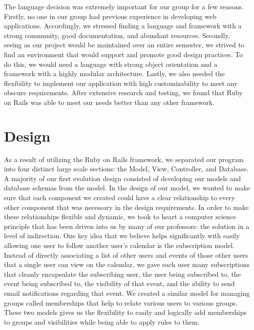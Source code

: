 \documentclass[11pt]{article}
\begin{document}

The language decision was extremely important for our group for a few reasons. Firstly, no one in our group had previous experience in developing web applications. Accordingly, we stressed finding a language and framework with a strong community, good documentation, and abundant resources. Secondly, seeing as our project would be maintained over an entire semester, we strived to find an environment that would support and promote good design practices. To do this, we would need a language with strong object orientation and a framework with a highly modular architecture. Lastly, we also needed the flexibility to implement our application with high customizability to meet any obscure requirements. After extensive research and testing, we found that Ruby on Rails was able to meet our needs better than any other framework. 


\section{Design}

As a result of utilizing the Ruby on Rails framework, we separated our program into four distinct large scale sections: the Model, View, Controller, and Database.  A majority of our first evolution design consisted of developing our models and database schemas from the model.  In the design of our model, we wanted to make sure that each component we created could have a clear relationship to every other component that was necessary in the design requirements.  In order to make these relationships flexible and dynamic, we took to heart a computer science principle that has been driven into us by many of our professors: the solution in a level of indirection.  One key idea that we believe helps significantly with easily allowing one user to follow another user's calendar is the subscription model.  Instead of directly associating a list of other users and events of those other users that a single user can view on the calendar, we gave each user many subscriptions that cleanly encapsulate the subscribing user, the user being subscribed to, the event being subscribed to, the visibility of that event, and the ability to send email notifications regarding that event.  We created a similar model for managing groups called memberships that help to relate various users to various groups.  These two models gives us the flexibility to easily and logically add memberships to groups and visibilities while being able to apply rules to them.
\end{document}
